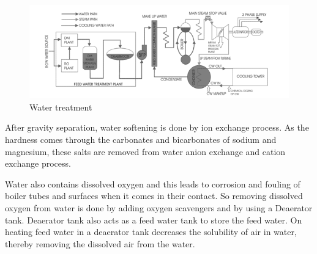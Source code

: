 \documentclass{report}
\begin{document}
\begin{figure}[H]
\centering \includegraphics[width=\textwidth]{images/tpp2.PNG}
\caption{Water treatment}
\end{figure}

\par After gravity separation, water softening is done by ion exchange process. As the hardness comes through the carbonates and bicarbonates of sodium and magnesium, these salts are removed from water anion exchange and cation exchange process. \par Water also contains dissolved oxygen and this leads to corrosion and fouling of boiler tubes and surfaces when it comes in their contact. So removing dissolved oxygen from water is done by adding oxygen scavengers and by using a Deaerator tank. Deaerator tank also acts as a feed water tank to store the feed water. On heating feed water in a deaerator tank decreases the solubility of air in water, thereby removing the dissolved air from the water.
\end{document}
